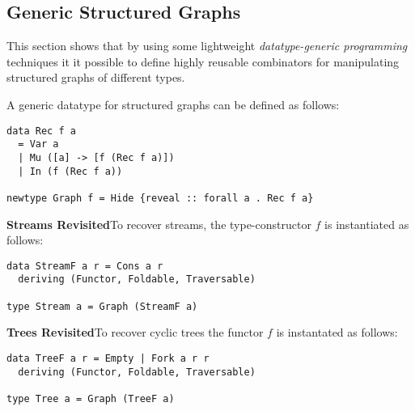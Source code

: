 \subsection{Generic Structured Graphs}\label{subsec:generic}

This section shows that by using some lightweight \emph{datatype-generic programming} techniques it
it possible to define highly reusable combinators for manipulating structured graphs of different types.

A generic datatype for structured graphs can be defined as follows:

\vspace{1mm}
\begin{verbatim}
data Rec f a
  = Var a
  | Mu ([a] -> [f (Rec f a)])
  | In (f (Rec f a))

newtype Graph f = Hide {reveal :: forall a . Rec f a}
\end{verbatim}
\vspace{1mm}

\textbf{Streams Revisited}\quad To recover streams, the type-constructor $f$ is instantiated as follows:

\vspace{1mm}
\begin{verbatim}
data StreamF a r = Cons a r
  deriving (Functor, Foldable, Traversable)

type Stream a = Graph (StreamF a)
\end{verbatim}
\vspace{1mm}

\textbf{Trees Revisited}\quad To recover cyclic trees the functor $f$ is instantated as follows:

\vspace{1mm}
\begin{verbatim}
data TreeF a r = Empty | Fork a r r
  deriving (Functor, Foldable, Traversable)

type Tree a = Graph (TreeF a)
\end{verbatim}
\vspace{1mm}
